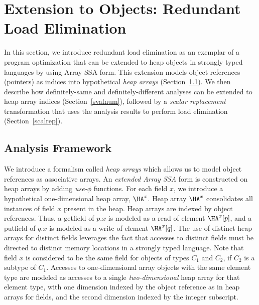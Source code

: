 \section{Extension to Objects: Redundant Load Elimination}
\label{sec:heap}
In this section, we
introduce redundant load elimination as an exemplar of a program
optimization that can be extended to heap objects  in strongly typed
languages by using Array SSA form.
This extension models object references (pointers) as
indices into hypothetical {\em heap arrays} (Section~\ref{model}).
We then describe how definitely-same and definitely-different analyses
can be extended to heap array indices (Section~\ref {svalnum}),
followed by a {\em scalar replacement} transformation
that uses the analysis results to perform load elimination (Section~\ref{scalrep}).

\subsection{Analysis Framework}\label{model}
We introduce a
formalism called {\em heap arrays} which allows us to model
object references as associative arrays.   
An {\em extended Array SSA} form is constructed on heap arrays by
adding
{\em use-$\phi$} functions.
For each field $x$, we introduce
a hypothetical one-dimensional
heap array,  $\HA^x$.
Heap array $\HA^x$ consolidates all instances of field
$x$ present in the heap.
Heap arrays are indexed by object references.
Thus, a {\sc getfield}
of $p.x$ is modeled as a read of element $\HA^x[p]$,
and a {\sc putfield} of $q.x$ is modeled as a write of element $\HA^x[q]$.
The use of distinct heap arrays for distinct fields leverages the 
fact that accesses to distinct fields must be directed to 
distinct memory locations in a strongly typed language.
Note that field $x$ is considered to be the same field for objects of types
$C_1$ and $C_2$, if $C_2$ is
a subtype of $C_1$.
Accesses to one-dimensional array objects with the same element type
are modeled as accesses to a single {\it two-dimensional} heap
array for that element type, with one dimension indexed by
the object reference as in heap arrays for fields, and the second
dimension indexed by the integer subscript. 

